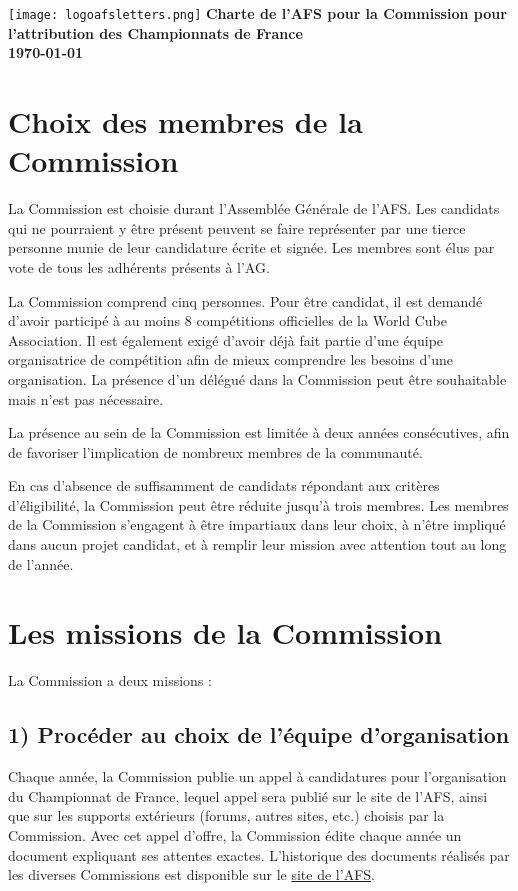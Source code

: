 \documentclass[a4paper,12pt]{scrartcl}
\newcommand{\documenttitle}{Charte de l'AFS pour la Commission pour l'attribution des Championnats de France}
\begin{document}

\begin{titlepage}
    \centering
    \vfill
    \texttt{[image: logoafsletters.png]}
    \vfill
    {\bfseries\Huge
        \documenttitle \\
        \vskip5cm
\today
    }    
    \vfill
\end{titlepage}


\pagebreak


\section*{Choix des membres de la Commission}
La Commission est choisie durant l'Assemblée Générale de l'AFS. Les candidats qui ne pourraient y être présent peuvent se faire représenter par une tierce personne munie de leur candidature écrite et signée. Les membres sont élus par vote de tous les adhérents présents à l'AG.

La Commission comprend cinq personnes. Pour être candidat, il est demandé d'avoir participé à au moins 8 compétitions officielles de la World Cube Association. Il est également exigé d'avoir déjà fait partie d'une équipe organisatrice de compétition afin de mieux comprendre les besoins d'une organisation. La présence d'un délégué dans la Commission peut être souhaitable mais n'est pas nécessaire.

La présence au sein de la Commission est limitée à deux années consécutives, afin de favoriser l'implication de nombreux membres de la communauté.

En cas d'absence de suffisamment de candidats répondant aux critères d'éligibilité, la Commission peut être réduite jusqu'à trois membres. Les membres de la Commission s'engagent à être impartiaux dans leur choix, à n'être impliqué dans aucun projet candidat, et à remplir leur mission avec attention tout au long de l'année.

\section*{Les missions de la Commission}
La Commission a deux missions :

\subsection*{1) Procéder au choix de l'équipe d'organisation}
Chaque année, la Commission publie un appel à candidatures pour l'organisation du Championnat de France, lequel appel sera publié sur le site de l'AFS, ainsi que sur les supports extérieurs (forums, autres sites, etc.) choisis par la Commission. Avec cet appel d'offre, la Commission édite chaque année un document expliquant ses attentes exactes. L'historique des documents réalisés par les diverses Commissions est disponible sur le \href{http://www.speedcubingfrance.org/speedcubing/cdf_historique/}{site de l'AFS}.
\end{document}
